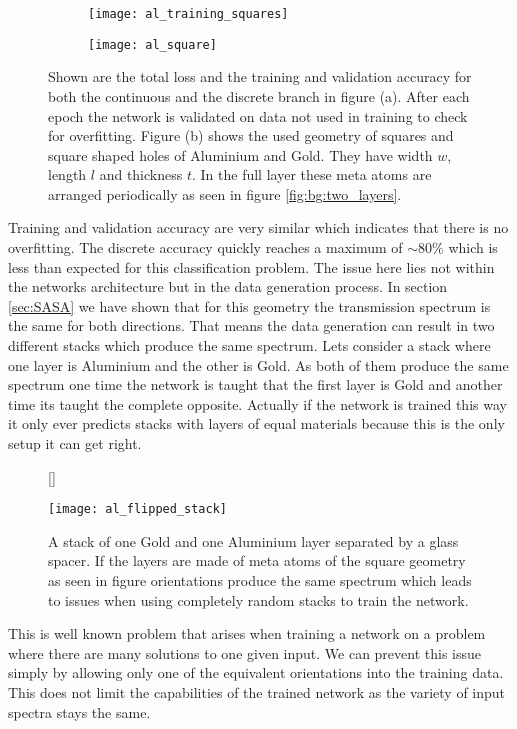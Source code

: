 \begin{figure}[H]
\centering
\begin{subfigure}{.6\textwidth}
    \centering
    \texttt{[image: al\_training\_squares]}
    \caption{}
    \label{}
\end{subfigure}%
\begin{subfigure}{.4\textwidth}
    \centering
    \texttt{[image: al\_square]}
    \caption{}
    \label{}
\end{subfigure}
\caption{Shown are the total loss and the training and validation accuracy for both the continuous and the discrete branch in figure (a). After each epoch the network is validated on data not used in training to check for overfitting. Figure (b) shows the used geometry of squares and square shaped holes of Aluminium and Gold. They have width $w$, length $l$ and thickness $t$. In the full layer these meta atoms are arranged periodically as seen in figure \ref{fig:bg:two_layers}.}
\label{}
\end{figure}


Training and validation accuracy are very similar which indicates that there is no overfitting. The discrete accuracy quickly reaches a maximum of $\sim 80\%$
which is less than expected for this classification problem. The issue here lies not within the networks architecture but in the data generation process. In section \ref{sec:SASA} we have shown that for this geometry the transmission spectrum is the same for both directions. That means the data generation can result in two different stacks which produce the same spectrum. Lets consider a stack where one layer is Aluminium and the other is Gold. As both of them produce the same spectrum one time the network is taught that the first layer is Gold and another time its taught the complete opposite. Actually if the network is trained this way it only ever predicts stacks with layers of equal materials because this is the only setup it can get right.
\\

\begin{figure}[H]
    [\FBwidth]
    {\caption{A stack of one Gold and one Aluminium layer separated by a glass spacer. If the layers are made of meta atoms of the square geometry as seen in figure orientations produce the same spectrum which leads to issues when using completely random stacks to train the network.}
    \label{fig:test}}
    {\texttt{[image: al\_flipped\_stack]}}
\end{figure}


\newpage
This is well known problem that arises when training a network on a problem where there are many solutions to one given input.
We can prevent this issue simply by allowing only one of the equivalent orientations into the training data. This does not limit the capabilities of the trained network as the variety of input spectra stays the same.
